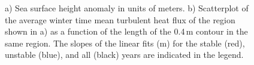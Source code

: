 


\begin{figure}[tb]
\caption{a) Sea surface height anomaly in units of meters. b) Scatterplot of the average winter time mean turbulent heat flux of the region shown in a) as a function of the length of the 0.4\,m contour in the same region. The slopes of the linear fits (m) for the stable (red), unstable (blue), and all (black) years are indicated in the legend. \label{fig:ssha_HF}}
   
\end{figure}










